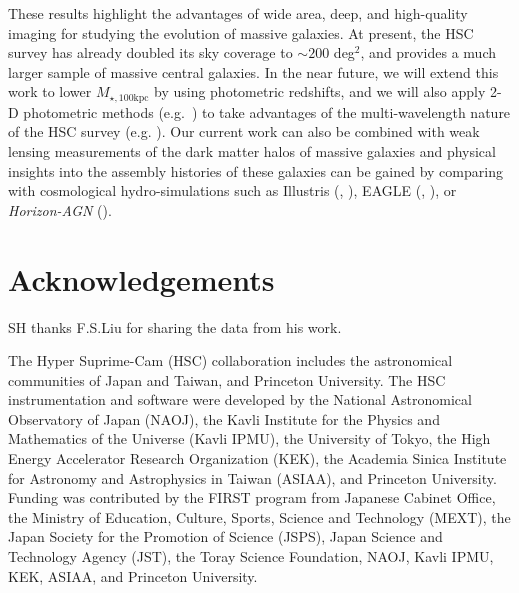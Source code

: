 \documentclass[a4paper,fleqn,usenatbib]{mnras}
\def\mtot{{$M_{\star,100\mathrm{kpc}}$}}
\begin{document}
    These results highlight the advantages of wide area, deep, and high-quality imaging 
    for studying the evolution of massive galaxies. 
    At present, the HSC survey has already doubled its sky coverage to 
    ${\sim} 200$ deg$^2$, and provides a much larger sample of massive central galaxies. 
    In the near future, we will extend this work to lower \mtot{} by using photometric 
    redshifts, and we will also apply 2-D photometric methods (e.g.\ \citealt{Huang2013a}) 
    to take advantages of the multi-wavelength nature of the HSC survey 
    (e.g. \citealt{Huang2016}). 
    Our current work can also be combined with weak lensing measurements of the dark 
    matter halos of massive galaxies and physical insights into the assembly histories 
    of these galaxies can be gained by comparing with cosmological hydro-simulations 
    such as Illustris (\citealt{Vogelsberger2014}, \citealt{Genel2014}), 
    EAGLE (\citealt{Schaye2015}, \citealt{Crain2015}), or \textit{Horizon-AGN} 
    (\citealt{Dubois2014}).

  
\section*{Acknowledgements}

  SH thanks F.S.Liu for sharing the data from his work.

  The Hyper Suprime-Cam (HSC) collaboration includes the astronomical communities of 
  Japan and Taiwan, and Princeton University.  The HSC instrumentation and software were
  developed by the National Astronomical Observatory of Japan (NAOJ), the Kavli Institute
  for the Physics and Mathematics of the Universe (Kavli IPMU), the University of Tokyo,
  the High Energy Accelerator Research Organization (KEK), the Academia Sinica Institute
  for Astronomy and Astrophysics in Taiwan (ASIAA), and Princeton University.  
  Funding was contributed by the FIRST program from Japanese Cabinet Office, the Ministry 
  of Education, Culture, Sports, Science and Technology (MEXT), the Japan Society for 
  the Promotion of Science (JSPS), Japan Science and Technology Agency (JST), the
  Toray Science Foundation, NAOJ, Kavli IPMU, KEK, ASIAA, and Princeton University.
   
\end{document}
